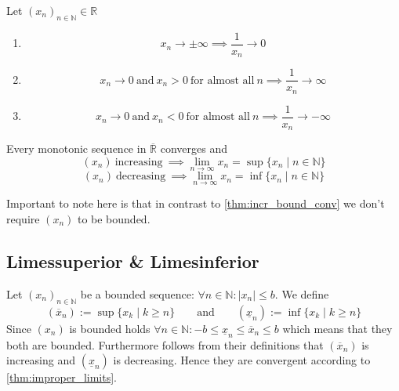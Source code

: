 \begin{theorem}
   Let \((x_n)_{n \in \mathbb{N}} \in \mathbb{R}\)
   \begin{enumerate}[label=\roman*, align=Center]
      \item \[x_n \to \pm\infty \implies \frac{1}{x_n} \to 0\]
      \item \[x_n \to 0~\text{and}~x_n > 0~\text{for almost all}~n \implies \frac{1}{x_n} \to \infty\]
      \item \[x_n \to 0~\text{and}~x_n < 0~\text{for almost all}~n \implies \frac{1}{x_n} \to -\infty\]
   \end{enumerate}
\end{theorem}

\begin{theorem}\label{thm:improper_limits}
   Every monotonic sequence in \(\overline{\mathbb{R}}\) converges and
   \[(x_n)~\text{increasing}~\implies \lim_{n \to \infty} x_n = \sup\{x_n \mid n \in \mathbb{N}\}\]
   \[(x_n)~\text{decreasing}~\implies \lim_{n \to \infty} x_n = \inf\{x_n \mid n \in \mathbb{N}\}\]
\end{theorem}
\begin{remark}
   Important to note here is that in contrast to \cref{thm:incr_bound_conv} we don't require \((x_n)\) to be bounded.
\end{remark}

\subsection{Limessuperior \& Limesinferior}
Let \((x_n)_{n \in \mathbb{N}}\) be a bounded sequence: \(\forall n \in \mathbb{N}: |x_n| \leq b\).
We define
\[(\overline{x}_n) := \sup\{x_k \mid k \geq n\} \qquad\text{and}\qquad (\underline{x}_n) := \inf\{x_k \mid k \geq n\}\]
Since \((x_n)\) is bounded holds \(\forall n \in \mathbb{N}: -b \leq \underline{x}_n \leq \overline{x}_n \leq b\) which means that they both are bounded.
Furthermore follows from their definitions that \((\overline{x}_n)\) is increasing and \((\underline{x}_n)\) is decreasing.
Hence they are convergent according to \cref{thm:improper_limits}.

